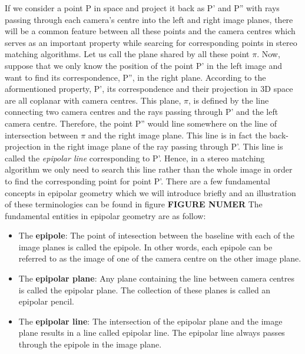\documentclass[dvips,letterpaper,12pt]{report}
\begin{document}
If we consider a point P in space and project it back as P' and P'' with rays passing through each camera's centre
into the left and right image planes, there will be a common feature between all these points and the camera centres which serves as an important property while searcing for corresponding points
in stereo matching algorithms. Let us call the plane shared by all these point $\pi$.
Now, suppose that we only know the position of the point P' in the left image and want to find its correspondence, P'', in the right plane. According to the aformentioned property, P',
its correspondence and their projection in 3D space are all coplanar with camera centres. This plane, $\pi$, is defined by the line connecting two camera centres and 
the rays passing through P' and the left camera centre. Therefore, the point P'' would line somewhere on the line of intersection between $\pi$ and the right image plane.
This line is in fact the back-projection in the right image plane of the ray passing through P'. This line is called the {\it epipolar line} corresponding to P'. Hence, in a stereo matching algorithm
we only need to search this line rather than the whole image in order to find the corresponding point for point P'.
There are a few fundamental concepts in epipolar geometry which we will introduce briefly and an illustration of these terminologies can be found in figure \textbf{FIGURE NUMER}
The fundamental entities in epipolar geometry are as follow: \cite{hart2000}
\begin{itemize}
\item The \textbf{epipole}: The point of intesection between the baseline with each of the image planes is called the epipole. In other words, each epipole can be referred to as the image of one of
the camera centre on the other image plane.

\item The \textbf{epipolar plane}: Any plane containing the line between camera centres is called the epipolar plane. The collection of these planes is called an epipolar pencil. 

\item The \textbf{epipolar line}: The intersection of the epipolar plane and the image plane results in a line called epipolar line. The epipolar line always passes through the epipole in the 
image plane.
\end{itemize}
\end{document}

